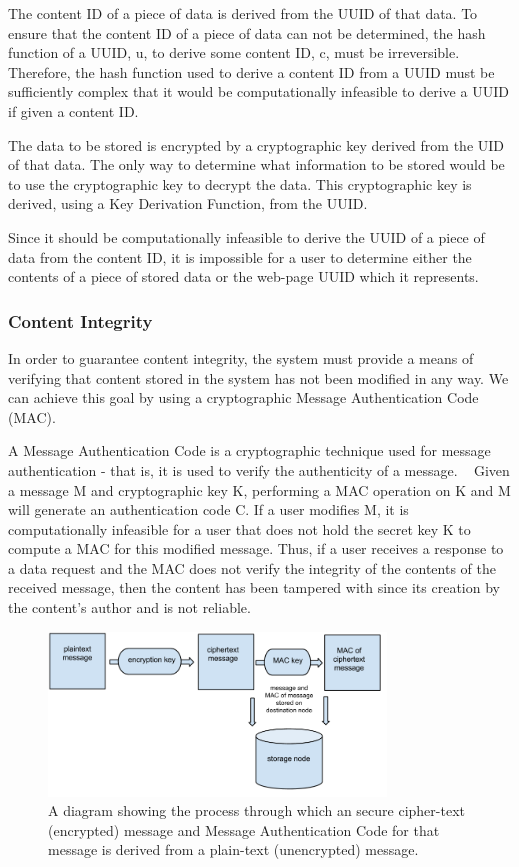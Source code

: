 The content ID of a piece of data is derived from the UUID of that data. To ensure that the content ID of a piece of data can not be determined,
the hash function of a UUID, u, to derive some content ID, c, must be irreversible. Therefore, the hash function used to derive a content ID
from a UUID must be sufficiently complex that it would be computationally infeasible to derive a UUID if given a content ID. ~\cite{sha1}

The data to be stored is encrypted by a cryptographic key derived from the UID of that data. The only way to determine what information to be
stored would be to use the cryptographic key to decrypt the data. This cryptographic key is derived, using a Key Derivation Function, from the UUID.

Since it should be computationally infeasible to derive the UUID of a piece of data from the content ID, it is impossible for a user to determine
either the contents of a piece of stored data or the web-page UUID which it represents.

\subsubsection{Content Integrity}

In order to guarantee content integrity, the system must provide a means of verifying that content stored in the system has not been modified
in any way. We can achieve this goal by using a cryptographic Message Authentication Code (MAC).

A Message Authentication Code is a cryptographic technique used for message authentication - that is, it is used to verify the authenticity of
a message. ~\cite{hmac} Given a message M and cryptographic key K, performing a MAC operation on K and M will generate an authentication code C. If a user
modifies M, it is computationally infeasible for a user that does not hold the secret key K to compute a MAC for this modified message. Thus,
if a user receives a response to a data request and the MAC does not verify the integrity of the contents of the received message, then the content
has been tampered with since its creation by the content's author and is not reliable.

\begin{figure}[H]
    \centering
    \includegraphics[width=0.8\textwidth]{img/mac.png}
    \caption{A diagram showing the process through which an secure cipher-text (encrypted) message and Message Authentication Code for that
    message is derived from a plain-text (unencrypted) message.}
    \label{fig:hmac}
\end{figure}



